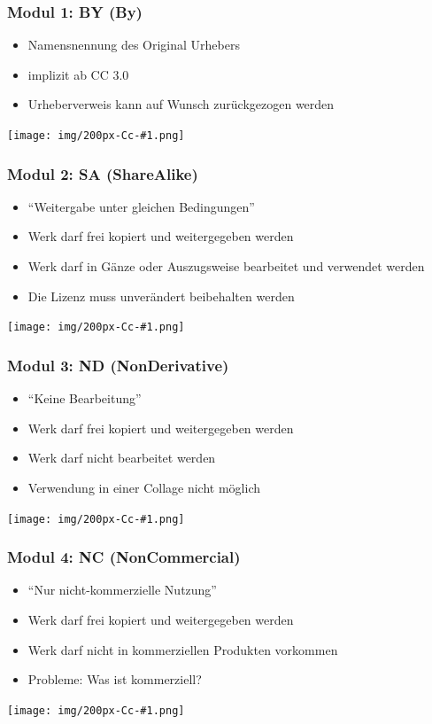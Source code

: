 \documentclass[table]{beamer}
\newcommand{\Cc}[1]{\begin{center}
    \texttt{[image: img/200px-Cc-\#1.png]}
\end{center}}
\begin{document}
\begin{frame}
    \frametitle{Modul 1: BY (By)}
    \begin{itemize}
        \item Namensnennung des Original Urhebers
        \item implizit ab CC 3.0
        \item Urheberverweis kann auf Wunsch zurückgezogen werden
    \end{itemize}
        \Cc{by}
\end{frame}

\begin{frame}
    \frametitle{Modul 2: SA (ShareAlike)}
    \begin{itemize}
        \item "`Weitergabe unter gleichen Bedingungen"'
        \item Werk darf frei kopiert und weitergegeben werden
        \item Werk darf in Gänze oder Auszugsweise bearbeitet und verwendet werden
        \item Die Lizenz muss unverändert beibehalten werden
    \end{itemize}
    \Cc{sa}
\end{frame}

\begin{frame}
    \frametitle{Modul 3: ND (NonDerivative)}
    \begin{itemize}
        \item "`Keine Bearbeitung"'
        \item Werk darf frei kopiert und weitergegeben werden
        \item Werk darf nicht bearbeitet werden
        \item Verwendung in einer Collage nicht möglich
    \end{itemize}
    \Cc{nd}
\end{frame}

\begin{frame}
    \frametitle{Modul 4: NC (NonCommercial)}
    \begin{itemize}
        \item "`Nur nicht-kommerzielle Nutzung"'
        \item Werk darf frei kopiert und weitergegeben werden
        \item Werk darf nicht in kommerziellen Produkten vorkommen
        \item Probleme: Was ist kommerziell?
    \end{itemize}
    \Cc{nc}
\end{frame}
\end{document}
